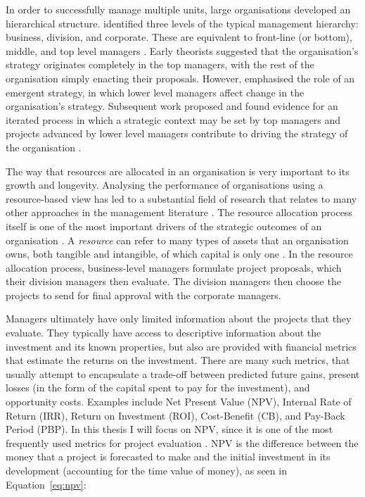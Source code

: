 \documentclass[a4paper, nobind, dvipsnames]{templates/ociamthesis}
\theoremstyle{definition}
\theoremstyle{definition}
\theoremstyle{definition}
\theoremstyle{definition}
\theoremstyle{remark}
\begin{document}
In order to successfully manage multiple units, large organisations developed an
hierarchical structure. \textcite{bower1970} identified three levels of the typical
management hierarchy: business, division, and corporate. These are equivalent to
front-line (or bottom), middle, and top level managers \autocite{noda1996}. Early
theorists suggested that the organisation's strategy originates completely in
the top managers, with the rest of the organisation simply enacting their
proposals. However, \textcite{mintzberg1985} emphasised the role of an emergent strategy,
in which lower level managers affect change in the organisation's strategy.
Subsequent work proposed and found evidence for an iterated process in which a
strategic context may be set by top managers and projects advanced by lower
level managers contribute to driving the strategy of the organisation
\autocite{noda1996,burgelman1983,bower1970}.

The way that resources are allocated in an organisation is very important to its
growth and longevity. Analysing the performance of organisations using a
resource-based view has led to a substantial field of research that relates to
many other approaches in the management literature \autocite{mahoney1992,barney1991}.
The resource allocation process itself is one of the most important drivers of
the strategic outcomes of an organisation \autocite{bower1970,bower2005}. A \emph{resource}
can refer to many types of assets that an organisation owns, both tangible and
intangible, of which capital is only one \autocite{wernerfelt1984}. In the resource
allocation process, business-level managers formulate project proposals, which
their division managers then evaluate. The division managers then choose the
projects to send for final approval with the corporate managers.

Managers ultimately have only limited information about the projects that they
evaluate. They typically have access to descriptive information about the
investment and its known properties, but also are provided with financial
metrics that estimate the returns on the investment. There are many such
metrics, that usually attempt to encapsulate a trade-off between predicted
future gains, present losses (in the form of the capital spent to pay for the
investment), and opportunity costs. Examples include Net Present Value (NPV),
Internal Rate of Return (IRR), Return on Investment (ROI), Cost-Benefit (CB),
and Pay-Back Period (PBP). In this thesis I will focus on NPV, since it is one
of the most frequently used metrics for project evaluation \autocite{graham2001,remer1993}. NPV is the difference between the money that a project is
forecasted to make and the initial investment in its development (accounting for
the time value of money), as seen in Equation~\eqref{eq:npv}:
\end{document}
